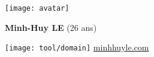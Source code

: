 \begin{minipage}{.20\textwidth}
		\texttt{[image: avatar]}
\end{minipage}
\begin{minipage}{.80\textwidth}
	\begin{minipage}{\textwidth}
		\begin{minipage}[t]{.35\textwidth}
			{
				\textbf{Minh-Huy LE} (26 ans)

			}
			\hfill
		\end{minipage}
		\begin{minipage}{.65\textwidth}
			\centering{
				\textbf{
%
				}
			}
			\hfill
		\end{minipage}
	\end{minipage}
	\begin{minipage}{\textwidth}
	
		\texttt{[image: tool/domain]}
		\href{www.minhhuyle.com}{minhhuyle.com}\hfill
	\end{minipage}
\end{minipage}

